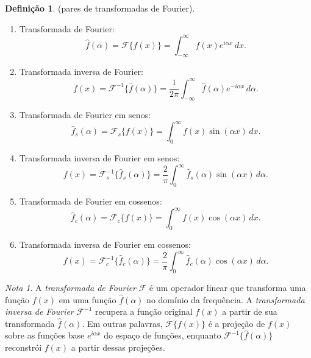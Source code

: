 \documentclass{article}
\theoremstyle{plain}
\theoremstyle{definition}
\newtheorem{defn}{Definição}[section]
\theoremstyle{remark}
\newtheorem*{rem}{Nota}
\begin{document}
\begin{defn} (pares de transformadas de Fourier).
    \begin{enumerate}
        \item[(i)] Transformada de Fourier: \begin{equation}
            \widehat{f}(\alpha) = \mathcal{F}\{f(x)\} = \int_{-\infty}^{\infty} f(x) e^{i\alpha x} \, dx.
        \end{equation}
        \item[] Transformada inversa de Fourier: \begin{equation}
            f(x) = \mathcal{F}^{-1}\{\widehat{f}(\alpha)\} = \frac{1}{2\pi} \int_{-\infty}^{\infty} \widehat{f}(\alpha) e^{-i\alpha x} \, d\alpha.
        \end{equation}
        \item[(ii)] Transformada de Fourier em senos: \begin{equation}
            \widehat{f}_s(\alpha) = \mathcal{F}_s\{f(x)\} = \int_{0}^{\infty} f(x) \sin(\alpha x) \, dx.
        \end{equation}
        \item[] Transformada inversa de Fourier em senos: \begin{equation}
            f(x) = \mathcal{F}_s^{-1}\{\widehat{f}_s(\alpha)\} = \frac{2}{\pi} \int_{0}^{\infty} \widehat{f}_s(\alpha) \sin(\alpha x) \, d\alpha.
        \end{equation}
        \item[(iii)] Transformada de Fourier em cossenos: \begin{equation}
            \widehat{f}_c(\alpha) = \mathcal{F}_c\{f(x)\} = \int_{0}^{\infty} f(x) \cos(\alpha x) \, dx.
        \end{equation}
        \item[] Transformada inversa de Fourier em cossenos: \begin{equation}
            f(x) = \mathcal{F}_c^{-1}\{\widehat{f}_c(\alpha)\} = \frac{2}{\pi} \int_{0}^{\infty} \widehat{f}_c(\alpha) \cos(\alpha x) \, d\alpha.
        \end{equation}
    \end{enumerate}
\end{defn}

\begin{rem}
    A \emph{transformada de Fourier} \(\mathcal{F}\) é um operador linear que transforma uma função \(f(x)\) em uma função \(\widehat{f}(\alpha)\) no domínio da frequência. A \emph{transformada inversa de Fourier} \(\mathcal{F}^{-1}\) recupera a função original \(f(x)\) a partir de sua transformada \(\widehat{f}(\alpha)\).
    Em outras palavras, \(\mathcal{F}\{f(x)\}\) é a projeção de \(f(x)\) sobre as funções base \(e^{i\alpha x}\) do espaço de funções, enquanto \(\mathcal{F}^{-1}\{\widehat{f}(\alpha)\}\) reconstrói \(f(x)\) a partir dessas projeções.
\end{rem}
\end{document}
